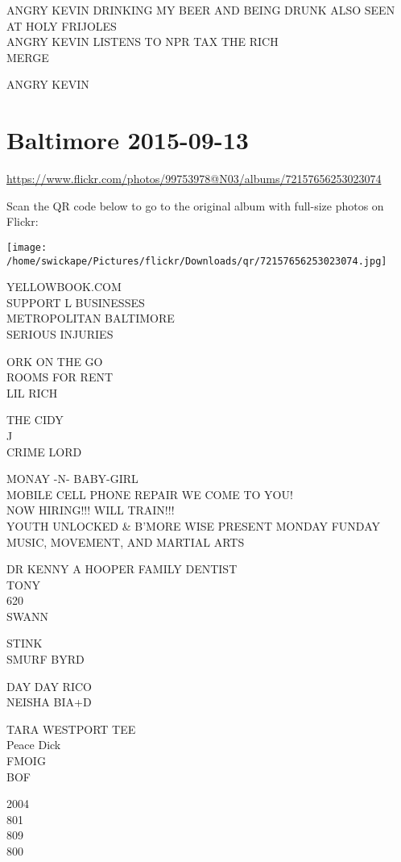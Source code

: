 \documentclass[10pt,letterpaper]{article}
\begin{document}
ANGRY KEVIN DRINKING MY BEER AND BEING DRUNK ALSO SEEN AT HOLY FRIJOLES\\
ANGRY KEVIN LISTENS TO NPR TAX THE RICH\\
MERGE

ANGRY KEVIN


\section*{Baltimore 2015-09-13}

\url{https://www.flickr.com/photos/99753978@N03/albums/72157656253023074}

Scan the QR code below to go to the original album with full-size photos on Flickr:

\texttt{[image: /home/swickape/Pictures/flickr/Downloads/qr/72157656253023074.jpg]}


YELLOWBOOK.COM\\
SUPPORT L BUSINESSES\\
METROPOLITAN BALTIMORE\\
SERIOUS INJURIES

ORK ON THE GO\\
ROOMS FOR RENT\\
LIL RICH

THE CIDY\\
J\\
CRIME LORD

MONAY {-}N{-} BABY{-}GIRL\\
MOBILE CELL PHONE REPAIR WE COME TO YOU!\\
NOW HIRING!!! WILL TRAIN!!!\\
YOUTH UNLOCKED \& B'MORE WISE PRESENT MONDAY FUNDAY MUSIC, MOVEMENT, AND MARTIAL ARTS

DR KENNY A HOOPER FAMILY DENTIST\\
TONY\\
620\\
SWANN

STINK\\
SMURF BYRD

DAY DAY RICO\\
NEISHA BIA+D

TARA WESTPORT TEE\\
Peace Dick\\
FMOIG\\
BOF

2004\\
801\\
809\\
800
\end{document}
